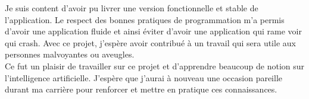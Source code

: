 \documentclass[UTF8]{EPURapport}
\begin{document}
Je suis content d'avoir pu livrer une version fonctionnelle et stable de l'application. Le respect des bonnes pratiques de programmation m'a permis d'avoir une application fluide et ainsi éviter d'avoir une application qui rame voir qui crash. Avec ce projet, j'espère avoir contribué à un travail qui sera utile aux personnes malvoyantes ou aveugles.\\

Ce fut un plaisir de travailler sur ce projet et d'apprendre beaucoup de notion sur l'intelligence artificielle. J'espère que j'aurai à nouveau une occasion pareille durant ma carrière pour renforcer et mettre en pratique ces connaissances.

\annexes
\end{document}
